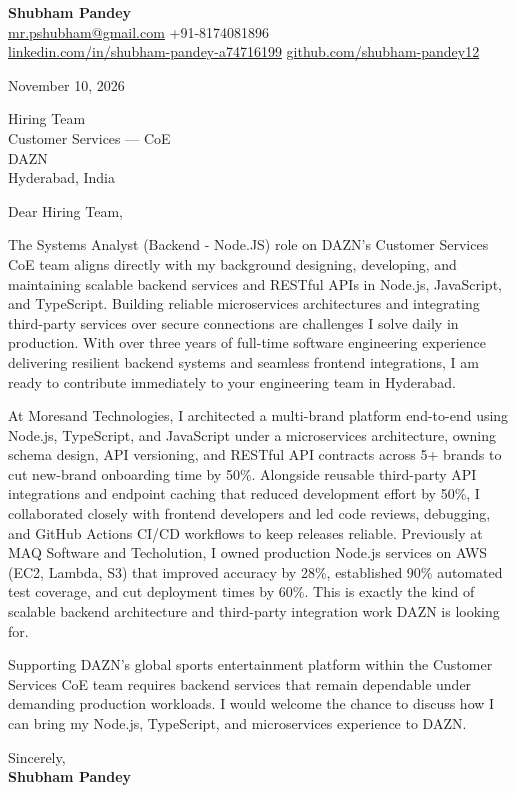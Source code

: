 \documentclass[a4paper,11pt]{article}
\begin{document}
\textbf{\Large Shubham Pandey}\\
\href{mailto:mr.pshubham@gmail.com}{mr.pshubham@gmail.com} \quad +91-8174081896\\
\href{https://www.linkedin.com/in/shubham-pandey-a74716199/}{linkedin.com/in/shubham-pandey-a74716199} \quad
\href{https://github.com/shubham-pandey12}{github.com/shubham-pandey12}

\vspace{1em}
November 10, 2026

\vspace{1em}
Hiring Team\\
Customer Services --- CoE\\
DAZN\\
Hyderabad, India

\vspace{1em}
Dear Hiring Team,

The Systems Analyst (Backend - Node.JS) role on DAZN's Customer Services CoE team aligns directly with my background designing, developing, and maintaining scalable backend services and RESTful APIs in Node.js, JavaScript, and TypeScript. Building reliable microservices architectures and integrating third-party services over secure connections are challenges I solve daily in production. With over three years of full-time software engineering experience delivering resilient backend systems and seamless frontend integrations, I am ready to contribute immediately to your engineering team in Hyderabad.

At Moresand Technologies, I architected a multi-brand platform end-to-end using Node.js, TypeScript, and JavaScript under a microservices architecture, owning schema design, API versioning, and RESTful API contracts across 5+ brands to cut new-brand onboarding time by 50\%. Alongside reusable third-party API integrations and endpoint caching that reduced development effort by 50\%, I collaborated closely with frontend developers and led code reviews, debugging, and GitHub Actions CI/CD workflows to keep releases reliable. Previously at MAQ Software and Techolution, I owned production Node.js services on AWS (EC2, Lambda, S3) that improved accuracy by 28\%, established 90\% automated test coverage, and cut deployment times by 60\%. This is exactly the kind of scalable backend architecture and third-party integration work DAZN is looking for.

Supporting DAZN's global sports entertainment platform within the Customer Services CoE team requires backend services that remain dependable under demanding production workloads. I would welcome the chance to discuss how I can bring my Node.js, TypeScript, and microservices experience to DAZN.

\vspace{1em}
Sincerely,\\[0.5em]
\textbf{Shubham Pandey}
\end{document}
